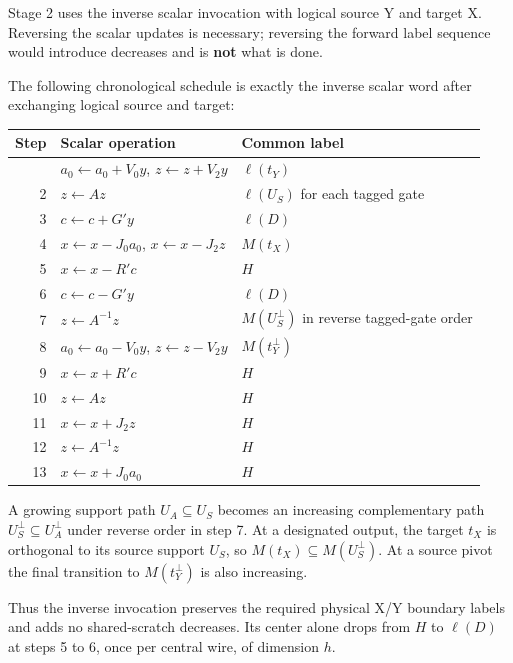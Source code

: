 \documentclass[
  11pt,
  letterpaper,
]{article}
\begin{document}
Stage 2 uses the inverse scalar invocation with logical source Y and
target X. Reversing the scalar updates is necessary; reversing the
forward label sequence would introduce decreases and is \textbf{not}
what is done.

The following chronological schedule is exactly the inverse scalar word
after exchanging logical source and target:

\begin{longtable}[]{@{}rll@{}}
\toprule\noalign{}
Step & Scalar operation & Common label \\
\midrule\noalign{}
\endhead
\bottomrule\noalign{}
\endlastfoot
1 & \(a_0\leftarrow a_0+V_0 y\), \(z\leftarrow z+V_2 y\) &
\(\ell(t_Y)\) \\
2 & \(z\leftarrow A z\) & \(\ell(U_S)\) for each tagged gate \\
3 & \(c\leftarrow c+G' y\) & \(\ell(D)\) \\
4 & \(x\leftarrow x-J_0 a_0\), \(x\leftarrow x-J_2 z\) & \(M(t_X)\) \\
5 & \(x\leftarrow x-R' c\) & \(H\) \\
6 & \(c\leftarrow c-G' y\) & \(\ell(D)\) \\
7 & \(z\leftarrow A^{-1} z\) & \(M(U_S^\perp)\) in reverse tagged-gate
order \\
8 & \(a_0\leftarrow a_0-V_0 y\), \(z\leftarrow z-V_2 y\) &
\(M(t_Y^\perp)\) \\
9 & \(x\leftarrow x+R' c\) & \(H\) \\
10 & \(z\leftarrow A z\) & \(H\) \\
11 & \(x\leftarrow x+J_2 z\) & \(H\) \\
12 & \(z\leftarrow A^{-1} z\) & \(H\) \\
13 & \(x\leftarrow x+J_0 a_0\) & \(H\) \\
\end{longtable}

A growing support path \(U_A\subseteq U_S\) becomes an increasing
complementary path \(U_S^\perp\subseteq U_A^\perp\) under reverse order
in step 7. At a designated output, the target \(t_X\) is orthogonal to
its source support \(U_S\), so \(M(t_X)\subseteq M(U_S^\perp)\). At a
source pivot the final transition to \(M(t_Y^\perp)\) is also
increasing.

Thus the inverse invocation preserves the required physical X/Y boundary
labels and adds no shared-scratch decreases. Its center alone drops from
\(H\) to \(\ell(D)\) at steps 5 to 6, once per central wire, of
dimension \(h\).
\end{document}
